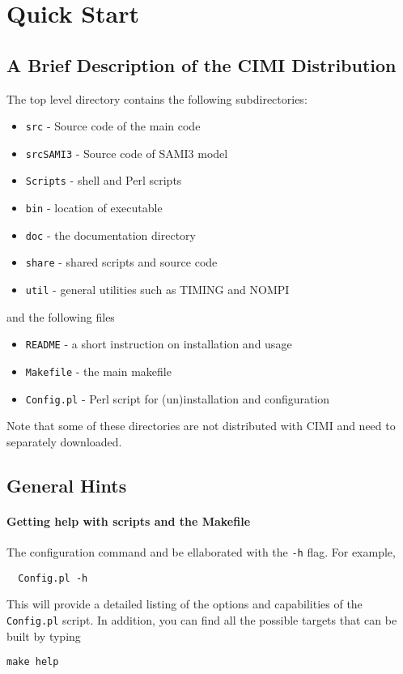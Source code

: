 
\chapter{Quick Start}

\section{A Brief Description of the CIMI Distribution}

The top level directory contains the following subdirectories:
\begin{itemize}
\item {\tt src}       - Source code of the main code
\item {\tt srcSAMI3}  - Source code of SAMI3 model
\item {\tt Scripts}   - shell and Perl scripts
\item {\tt bin}       - location of executable
\item {\tt doc}       - the documentation directory 
\item {\tt share}     - shared scripts and source code
\item {\tt util}      - general utilities such as TIMING and NOMPI
\end{itemize}
and the following files
\begin{itemize}
\item {\tt README}        - a short instruction on installation and usage
\item {\tt Makefile}      - the main makefile
\item {\tt Config.pl}     - Perl script for (un)installation and configuration
\end{itemize}

Note that some of these directories are not distributed with CIMI and need to separately downloaded. 
\section{General Hints}

\subsubsection{Getting help with scripts and the Makefile}

The configuration command and be ellaborated with the  {\tt -h} flag.
For example, 
\begin{verbatim}
  Config.pl -h
\end{verbatim}
This will provide a detailed listing of the options and capabilities of the
{\tt Config.pl} script.  In addition, you can find all the possible
targets  that can be built by typing
\begin{verbatim}
make help
\end{verbatim}

